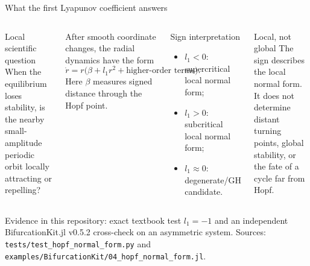 \begin{frame}{What the first Lyapunov coefficient answers}
\begin{columns}[T]
\begin{block}{Local scientific question}
When the equilibrium loses stability, is the nearby small-amplitude periodic
orbit locally attracting or repelling?
\end{block}
After smooth coordinate changes, the radial dynamics have the form
\[
  \dot r=r\bigl(\beta+l_1r^2+\text{higher-order terms}\bigr).
\]
Here $\beta$ measures signed distance through the Hopf point.
\begin{block}{Sign interpretation}
\begin{itemize}
  \item $l_1<0$: supercritical local normal form;
  \item $l_1>0$: subcritical local normal form;
  \item $l_1\approx0$: degenerate/GH candidate.
\end{itemize}
\end{block}
\begin{alertblock}{Local, not global}
The sign describes the local normal form. It does not determine distant
turning points, global stability, or the fate of a cycle far from Hopf.
\end{alertblock}
\end{columns}
\vspace{2mm}
{\scriptsize Evidence in this repository: exact textbook test $l_1=-1$ and an
independent BifurcationKit.jl v0.5.2 cross-check on an asymmetric system.
Sources: \texttt{tests/test\_hopf\_normal\_form.py} and
\texttt{examples/BifurcationKit/04\_hopf\_normal\_form.jl}.}
\end{frame}

